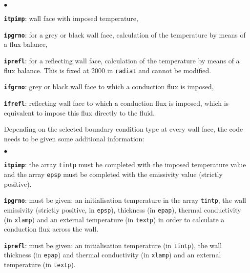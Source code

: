 {{\begin{list}{$\bullet$}{}

\item \texttt{\textbf{itpimp}}: wall face with imposed temperature,

\item \texttt{\textbf{ipgrno}}: for a grey or black wall face, calculation of the
      temperature by means of a flux balance,

\item \texttt{\textbf{iprefl}}: for a reflecting wall face, calculation of the
      temperature by means of a flux balance.
 This is fixed at 2000 in \texttt{radiat} and cannot be modified.

\item \texttt{\textbf{ifgrno}}: grey or black wall face to which a conduction
      flux is imposed,

\item \texttt{\textbf{ifrefl}}: reflecting wall face to which a conduction
      flux is imposed, which is equivalent to impose this flux directly
      to the fluid.

\end{list}

\noindent
Depending on the selected boundary condition type at every wall face,
the code needs to be given some additional information:

\begin{list}{$\bullet$}{}

\item \texttt{\textbf{itpimp}}: the array \texttt{tintp} must be completed
      with the imposed temperature value and the array \texttt{epsp} must
      be completed with the emissivity value (strictly positive).

\item \texttt{\textbf{ipgrno}}: must be given: an initialisation temperature in
      the array \texttt{tintp}, the wall emissivity (strictly positive, in
      \texttt{epsp}), thickness (in \texttt{epap}), thermal conductivity
      (in \texttt{xlamp}) and an external temperature (in \texttt{textp})
      in order to calculate a conduction flux across the wall.

\item \texttt{\textbf{iprefl}}: must be given: an initialisation temperature (in
      \texttt{tintp}), the wall thickness (in \texttt{epap}) and thermal conductivity (in
      \texttt{xlamp}) and an external temperature (in \texttt{textp}).


\end{list}}}
